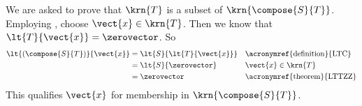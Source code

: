 We are asked to prove that $\krn{T}$ is a subset of $\krn{\compose{S}{T}}$.  Employing , choose $\vect{x}\in\krn{T}$.  Then we know that $\lt{T}{\vect{x}}=\zerovector$.  So
%
\begin{align*}
\lt{\left(\compose{S}{T}\right)}{\vect{x}}&=\lt{S}{\lt{T}{\vect{x}}}&&\text{\acronymref{definition}{LTC}}\\
&=\lt{S}{\zerovector}&&\vect{x}\in\krn{T}\\
&=\zerovector&&\text{\acronymref{theorem}{LTTZZ}}
\end{align*}
%
This qualifies $\vect{x}$ for membership in $\krn{\compose{S}{T}}$.
